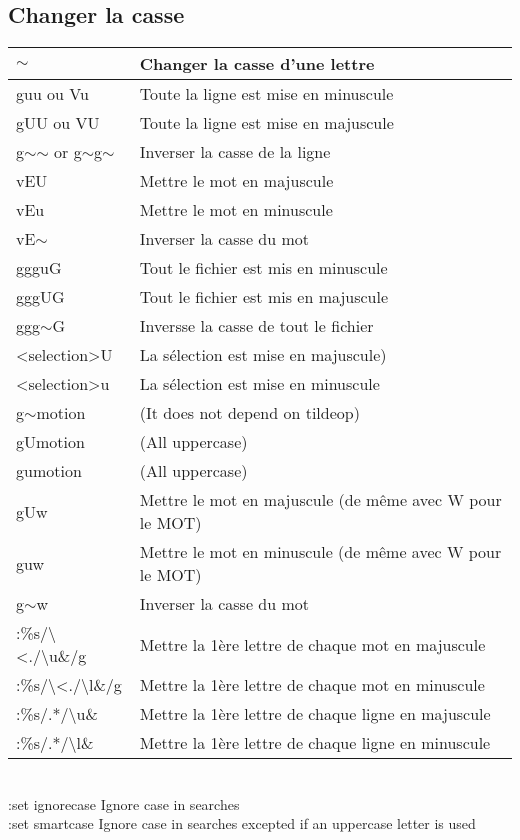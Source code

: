 \documentclass{article}
\begin{document}
\subsection{Changer la casse}
\begin{tabular}{|p{3cm}| l| }\hline
    $\sim$ & Changer la casse d'une lettre \\ \hline
guu ou Vu& Toute la ligne est mise en minuscule\\ \hline
gUU ou VU & Toute la ligne est mise en majuscule\\ \hline
g$\sim$$\sim$ or g$\sim$g$\sim$ & Inverser la casse de la ligne\\ \hline
vEU & Mettre le mot en majuscule \\ \hline
vEu & Mettre le mot en minuscule\\ \hline
vE$\sim$ & Inverser la casse du mot\\ \hline
ggguG & Tout le fichier est mis en minuscule\\ \hline
gggUG & Tout le fichier est mis en majuscule\\ \hline
ggg$\sim$G & Inversse la casse de tout le fichier \\ \hline
<selection>U & La sélection est mise en majuscule) \\ \hline
<selection>u & La sélection est mise en minuscule \\ \hline
g$\sim$motion & (It does not depend on tildeop) \\ \hline
gUmotion & (All uppercase) \\ \hline
gumotion & (All uppercase) \\ \hline
gUw & Mettre le mot en majuscule (de même avec W pour le MOT)\\ \hline
guw & Mettre le mot en minuscule (de même avec W pour le MOT)\\ \hline
g$\sim$w & Inverser la casse du mot \\ \hline
    :\%s/\textbackslash{}\textless{}./\textbackslash{}u\&/g & Mettre la 1ère lettre de chaque mot en majuscule \\ \hline
    :\%s/\textbackslash{}\textless{}./\textbackslash{}l\&/g & Mettre la 1ère lettre de chaque mot en minuscule \\ \hline
    :\%s/.*/\textbackslash{}u\& &	Mettre la 1ère lettre de chaque ligne en majuscule\\ \hline
    :\%s/.*/\textbackslash{}l\& &	Mettre la 1ère lettre de chaque ligne en minuscule\\ \hline
\end{tabular}\\
:set ignorecase Ignore case in searches\\
:set smartcase Ignore case in searches excepted if an uppercase letter is used
\end{document}
